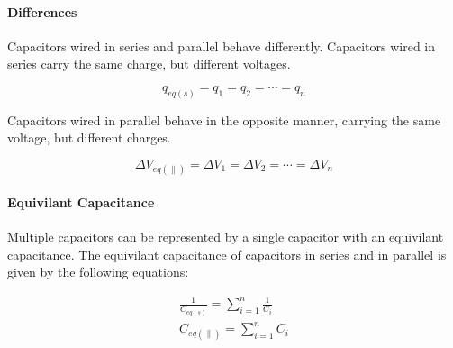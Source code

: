 \paragraph*{Differences}
Capacitors wired in series and parallel behave differently. Capacitors wired in series carry the same charge, but different voltages.

\begin{equation*}
    q_{eq(s)} = q_1 = q_2 = \cdots = q_n
\end{equation*}

Capacitors wired in parallel behave in the opposite manner, carrying the same voltage, but different charges.

\begin{equation*}
    \Delta V_{eq(\parallel)} = \Delta V_1 = \Delta V_2 = \cdots = \Delta V_n
\end{equation*}
    

\paragraph*{Equivilant Capacitance}
Multiple capacitors can be represented by a single capacitor with an equivilant capacitance. The equivilant capacitance of 
capacitors in series and in parallel is given by the following equations:

\begin{align*}
    \frac{1}{C_{eq(s)}} = \sum_{i=1}^{n} \frac{1}{C_i}\\
    C_{eq(\parallel)} = \sum_{i=1}^{n} C_i
\end{align*}



